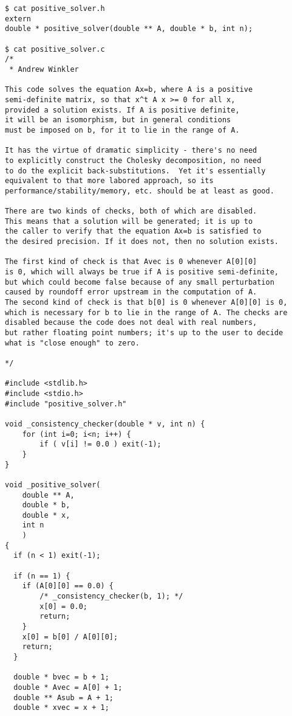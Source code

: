 \documentclass{article}
\begin{document}
\begin{verbatim}
$ cat positive_solver.h 
extern
double * positive_solver(double ** A, double * b, int n);

$ cat positive_solver.c
/* 
 * Andrew Winkler

This code solves the equation Ax=b, where A is a positive
semi-definite matrix, so that x^t A x >= 0 for all x,
provided a solution exists. If A is positive definite,
it will be an isomorphism, but in general conditions
must be imposed on b, for it to lie in the range of A.

It has the virtue of dramatic simplicity - there's no need
to explicitly construct the Cholesky decomposition, no need
to do the explicit back-substitutions.  Yet it's essentially
equivalent to that more labored approach, so its
performance/stability/memory, etc. should be at least as good.

There are two kinds of checks, both of which are disabled.
This means that a solution will be generated; it is up to
the caller to verify that the equation Ax=b is satisfied to
the desired precision. If it does not, then no solution exists.

The first kind of check is that Avec is 0 whenever A[0][0]
is 0, which will always be true if A is positive semi-definite,
but which could become false because of any small perturbation
caused by roundoff error upstream in the computation of A.
The second kind of check is that b[0] is 0 whenever A[0][0] is 0,
which is necessary for b to lie in the range of A. The checks are
disabled because the code does not deal with real numbers,
but rather floating point numbers; it's up to the user to decide
what is "close enough" to zero.

*/

#include <stdlib.h>
#include <stdio.h>
#include "positive_solver.h"

void _consistency_checker(double * v, int n) {
    for (int i=0; i<n; i++) {
        if ( v[i] != 0.0 ) exit(-1);
    }
}

void _positive_solver(
    double ** A, 
    double * b, 
    double * x, 
    int n
    ) 
{
  if (n < 1) exit(-1);

  if (n == 1) {
    if (A[0][0] == 0.0) {
        /* _consistency_checker(b, 1); */
        x[0] = 0.0;
        return;
    }
    x[0] = b[0] / A[0][0];
    return;
  }

  double * bvec = b + 1;
  double * Avec = A[0] + 1;
  double ** Asub = A + 1;
  double * xvec = x + 1;


\end{verbatim}
\end{document}
